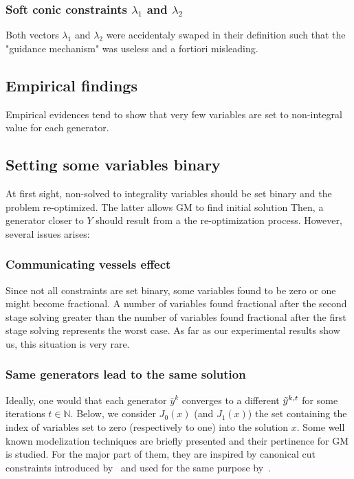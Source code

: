 \subsubsection{Soft conic constraints $\lambda_1$ and $\lambda_2$}
Both vectors $\lambda_1$ and $\lambda_2$ were accidentaly swaped in their definition such that the "guidance mechanism" was useless and a fortiori misleading.

\subsection{Empirical findings}
Empirical evidences tend to show that very few variables are set to non-integral value for each generator.

\subsection{Setting some variables binary}
At first sight, non-solved to integrality variables should be set binary and the problem re-optimized. The latter allows GM to find initial solution Then, a generator closer to $Y$ should result from a the re-optimization process. However, several issues arises:

\subsubsection{Communicating vessels effect}
Since not all constraints are set binary, some variables found to be zero or one might become fractional. 
A number of variables found fractional after the second stage solving greater than the number of variables found fractional after the first stage solving represents the worst case. 
As far as our experimental results show us, this situation is very rare. 
\subsubsection{Same generators lead to the same solution}
Ideally, one would that each generator $\bar{y}^k$ converges to a different $\Tilde{y}^{k,t}$ for some iterations $t\in \mathbb{N}$.
Below, we consider $J_0(x)$ (and $J_1(x)$) the set containing the index of variables set to zero (respectively to one) into the solution $x$.
Some well known modelization techniques are briefly presented and their pertinence for GM is studied. For the major part of them, 
they are inspired by canonical cut constraints introduced by~\cite{canonical_cut} and used for the same purpose by~\cite{Hanafi2011}.

